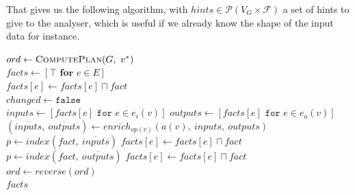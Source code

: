 \documentclass[11pt]{article}
\begin{document}
That gives us the following algorithm, with $hints \in \mathcal{P}(V_G \times \mathcal{F})$ a set of hints to give to the analyser, which is useful if we already know the shape of the input data for instance.\\

\begin{algorithmic}[1]
    \State $ord \gets \textsc{ComputePlan}(G,\ v^*)$\\
    
    \State {}
    \State $facts \gets [\top \textbf{ for } e \in E]$\\

    \State {}
            \State $facts[e] \gets facts[e] \sqcap fact$
        \EndFor
    \EndFor\\
    
    \State {}
    \Loop
        \State $changed \gets \texttt{false}$\\

            \State $inputs \gets [facts[e] \texttt{ for } e \in e_i(v)]$
            \State $outputs \gets [facts[e] \texttt{ for } e \in e_o(v)]$\\
            
            \State $(\overline{inputs},\ \overline{outputs}) \gets enrich_{op(v)}(a(v),\ inputs,\ outputs)$\\
            
                \State $p \gets index(fact,\ \overline{inputs})$
                    \State $facts[e] \gets facts[e] \sqcap fact$
                \EndFor
            \EndFor\\
            
                \State $p \gets index(fact,\ \overline{outputs})$
                    \State $facts[e] \gets facts[e] \sqcap fact$
                \EndFor
            \EndFor
        \EndFor\\
        
        \State $ord \gets reverse(ord)$\\

            \State \Return $facts$
        \EndIf
    \EndLoop
\EndFunction
\end{algorithmic}
\end{document}
